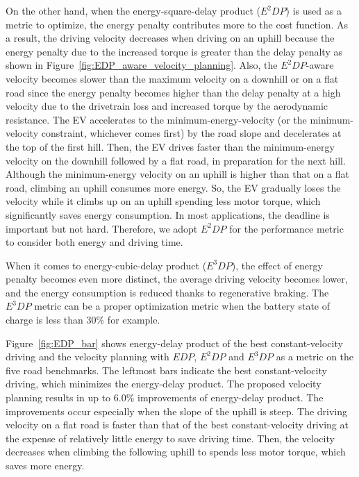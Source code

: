 \documentclass{IEEEtran}
\begin{document}
On the other hand, when the energy-square-delay product ($E^2DP$) is used as a metric to optimize, the energy penalty contributes more to the cost function. As a result, the driving velocity decreases when driving on an uphill because the energy penalty due to the increased torque is greater than the delay penalty as shown in Figure~\ref{fig:EDP_aware_velocity_planning}. Also, the $E^2DP$-aware velocity becomes slower than the maximum velocity on a downhill or on a flat road since the energy penalty becomes higher than the delay penalty at a high velocity due to the drivetrain loss and increased torque by the aerodynamic resistance. The EV accelerates to the minimum-energy-velocity (or the minimum-velocity constraint, whichever comes first) by the road slope and decelerates at the top of the first hill. Then, the EV drives faster than the minimum-energy velocity on the downhill followed by a  flat road, in preparation for the next hill. Although the minimum-energy velocity on an uphill is higher than that on a flat road, climbing an uphill consumes more energy. So, the EV gradually loses the velocity while it climbs up on an uphill spending less motor torque, which significantly saves energy consumption. In most applications, the deadline is important but not hard. Therefore, we adopt $E^2DP$ for the performance metric to consider both energy and driving time.

When it comes to energy-cubic-delay product ($E^3DP$), the effect of energy penalty becomes even more distinct, the average driving velocity becomes lower, and the energy consumption is reduced thanks to regenerative braking. The $E^3DP$ metric can be a proper optimization metric when the battery state of charge is less than 30\% for example.

Figure~\ref{fig:EDP_bar} shows energy-delay product of the best constant-velocity driving and the velocity planning with $EDP$, $E^2DP$ and $E^3DP$ as a metric on the five road benchmarks. The leftmost bars indicate the best constant-velocity driving, which minimizes the energy-delay product. The proposed velocity planning results in up to 6.0\% improvements of energy-delay product. The improvements occur especially when the slope of the uphill is steep. The driving velocity on a flat road is faster than that of the best constant-velocity driving at the expense of relatively little energy to save driving time. Then, the velocity decreases when climbing the following uphill to spends less motor torque, which saves more energy.
\end{document}
